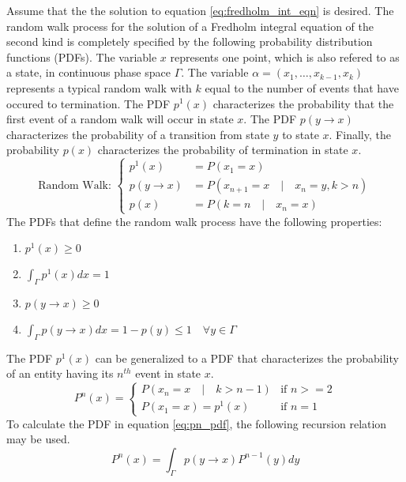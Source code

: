 Assume that the the solution to equation \ref{eq:fredholm_int_eqn} is desired.
The random walk process for the solution of a Fredholm integral equation of
the second kind is completely specified by the following probability
distribution functions (PDFs). The variable $x$ represents one point, which 
is also refered to as a state, in continuous phase space $\Gamma$. The 
variable $\alpha = (x_1,\ldots,x_{k-1},x_k)$ represents a typical random walk 
with $k$ equal to the number of events that have occured to termination. The 
PDF $p^1(x)$ characterizes the probability that the first event of a random 
walk will occur in state $x$. The PDF $p(y \to x)$ characterizes the probability
of a transition from state $y$ to state $x$. Finally, the probability $p(x)$
characterizes the probability of termination in state $x$. 
\begin{equation}
  \text{Random Walk: }
  \begin{cases}
    p^1(x) & = P(x_1 = x) \\
    p(y \to x) & = P(x_{n+1} = x \quad|\quad x_n = y, k > n)  \\
    p(x) & = P(k = n \quad|\quad x_n = x) 
  \end{cases}
  \label{eq:mc_random_walk_pdfs}
\end{equation}
The PDFs that define the random walk process have the following properties:
\begin{enumerate}
  \item $p^1(x) \geq 0$
  \item $\int_{\Gamma} p^1(x)dx = 1$
  \item $p(y \to x) \geq 0$
  \item $\int_{\Gamma} p(y \to x)dx = 1 - p(y) \leq 1 \quad \forall y \in\Gamma$
\end{enumerate}
The PDF $p^1(x)$ can be generalized to a PDF that characterizes the
probability of an entity having its $n^{th}$ event in state $x$. 
\begin{equation}
  P^n(x) = 
  \begin{cases} 
    P(x_n = x \quad|\quad k > n-1) & \text{if } n >= 2 \\
    P(x_1 = x) = p^1(x) & \text{if } n = 1 
  \end{cases}
  \label{eq:pn_pdf}
\end{equation}
To calculate the PDF in equation \ref{eq:pn_pdf}, the following recursion
relation may be used.
\begin{equation}
  P^n(x) = \int_{\Gamma} p(y \to x) P^{n-1}(y)dy
  \label{eq:pn_recursion_rel}
\end{equation}

